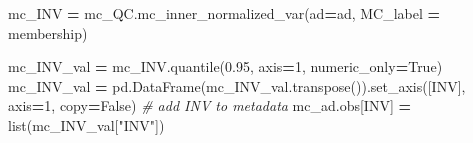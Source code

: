 \documentclass[
]{book}
\newenvironment{Shaded}{\begin{snugshade}}{\end{snugshade}}
\newcommand{\BuiltInTok}[1]{#1}
\newcommand{\CommentTok}[1]{\textcolor[rgb]{0.56,0.35,0.01}{\textit{#1}}}
\newcommand{\DecValTok}[1]{\textcolor[rgb]{0.00,0.00,0.81}{#1}}
\newcommand{\FloatTok}[1]{\textcolor[rgb]{0.00,0.00,0.81}{#1}}
\newcommand{\NormalTok}[1]{#1}
\newcommand{\OperatorTok}[1]{\textcolor[rgb]{0.81,0.36,0.00}{\textbf{#1}}}
\newcommand{\StringTok}[1]{\textcolor[rgb]{0.31,0.60,0.02}{#1}}
\newcommand{\VariableTok}[1]{\textcolor[rgb]{0.00,0.00,0.00}{#1}}
\begin{document}
\begin{Shaded}
\begin{Highlighting}[]
\NormalTok{mc\_INV }\OperatorTok{=}\NormalTok{ mc\_QC.mc\_inner\_normalized\_var(ad}\OperatorTok{=}\NormalTok{ad, MC\_label }\OperatorTok{=} \StringTok{\textquotesingle{}membership\textquotesingle{}}\NormalTok{)}

\NormalTok{mc\_INV\_val }\OperatorTok{=}\NormalTok{ mc\_INV.quantile(}\FloatTok{0.95}\NormalTok{, axis}\OperatorTok{=}\DecValTok{1}\NormalTok{, numeric\_only}\OperatorTok{=}\VariableTok{True}\NormalTok{)}
\NormalTok{mc\_INV\_val }\OperatorTok{=}\NormalTok{ pd.DataFrame(mc\_INV\_val.transpose()).set\_axis([}\StringTok{\textquotesingle{}INV\textquotesingle{}}\NormalTok{], axis}\OperatorTok{=}\DecValTok{1}\NormalTok{, copy}\OperatorTok{=}\VariableTok{False}\NormalTok{)}
\CommentTok{\# add INV to metadata}
\NormalTok{mc\_ad.obs[}\StringTok{\textquotesingle{}INV\textquotesingle{}}\NormalTok{] }\OperatorTok{=} \BuiltInTok{list}\NormalTok{(mc\_INV\_val[}\StringTok{"INV"}\NormalTok{])}
\end{Highlighting}
\end{Shaded}
\end{document}
